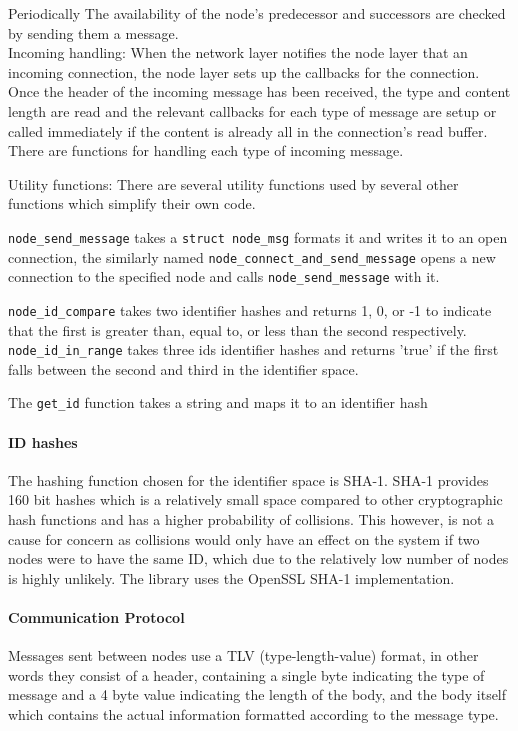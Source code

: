 \documentclass{article}
\begin{document}
Periodically The availability of the node's predecessor and successors are checked by sending them a message.
\\

\noindent
Incoming handling: When the network layer notifies the node layer that an incoming connection, the node layer sets up the callbacks for the connection. Once the header of the incoming message has been received, the type and content length are read and the relevant callbacks for each type of message are setup or called immediately if the content is already all in the connection's read buffer. There are functions for handling each type of incoming message.

\noindent
Utility functions: There are several utility functions used by several other functions which simplify their own code.

\texttt{node\_send\_message} takes a \texttt{struct node\_msg} formats it and writes it to an open connection, the similarly named \texttt{node\_connect\_and\_send\_message} opens a new connection to the specified node and calls \texttt{node\_send\_message} with it.

\texttt{node\_id\_compare} takes two identifier hashes and returns 1, 0, or -1 to indicate that the first is greater than, equal to, or less than the second respectively.
\texttt{node\_id\_in\_range} takes three ids identifier hashes and returns 'true' if the first falls between the second and third in the identifier space.

The \texttt{get\_id} function takes a string and maps it to an identifier hash

\paragraph{ID hashes}
The hashing function chosen for the identifier space is SHA-1. SHA-1 provides 160 bit hashes which is a relatively small space compared to other cryptographic hash functions and has a higher probability of collisions. This however, is not a cause for concern as collisions would only have an effect on the system if two nodes were to have the same ID, which due to the relatively low number of nodes is highly unlikely.
The library uses the OpenSSL \cite{openssl} SHA-1 implementation.

\paragraph{Communication Protocol}
Messages sent between nodes use a TLV (type-length-value) format, in other words they consist of a header, containing a single byte indicating the type of message and a 4 byte value indicating the length of the body, and the body itself which contains the actual information formatted according to the message type.
\end{document}
